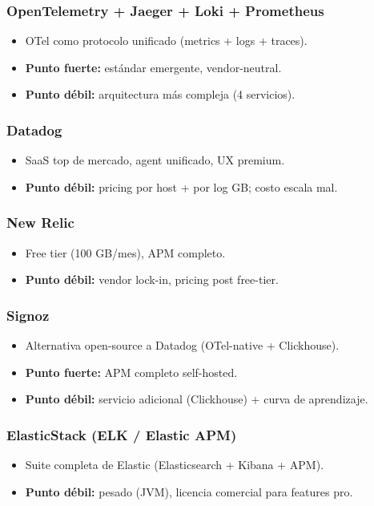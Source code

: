 \documentclass[11pt,a4paper]{article}
\begin{document}
\subsubsection{OpenTelemetry + Jaeger + Loki + Prometheus}
\begin{itemize}[leftmargin=*,itemsep=0pt]
\item OTel como protocolo unificado (metrics + logs + traces).
\item \textbf{Punto fuerte:} estándar emergente, vendor-neutral.
\item \textbf{Punto débil:} arquitectura más compleja (4 servicios).
\end{itemize}

\subsubsection{Datadog}
\begin{itemize}[leftmargin=*,itemsep=0pt]
\item SaaS top de mercado, agent unificado, UX premium.
\item \textbf{Punto débil:} pricing por host + por log GB; costo escala mal.
\end{itemize}

\subsubsection{New Relic}
\begin{itemize}[leftmargin=*,itemsep=0pt]
\item Free tier (100 GB/mes), APM completo.
\item \textbf{Punto débil:} vendor lock-in, pricing post free-tier.
\end{itemize}

\subsubsection{Signoz}
\begin{itemize}[leftmargin=*,itemsep=0pt]
\item Alternativa open-source a Datadog (OTel-native + Clickhouse).
\item \textbf{Punto fuerte:} APM completo self-hosted.
\item \textbf{Punto débil:} servicio adicional (Clickhouse) + curva de aprendizaje.
\end{itemize}

\subsubsection{ElasticStack (ELK / Elastic APM)}
\begin{itemize}[leftmargin=*,itemsep=0pt]
\item Suite completa de Elastic (Elasticsearch + Kibana + APM).
\item \textbf{Punto débil:} pesado (JVM), licencia comercial para features pro.
\end{itemize}
\end{document}
